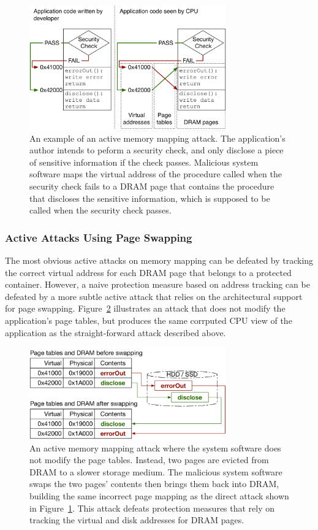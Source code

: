 \begin{figure}[hbt]
  \centering
  \includegraphics[width=85mm]{figures/active_mapping_attack.pdf}
  \caption{
    An example of an active memory mapping attack. The application's author
    intends to peform a security check, and only disclose a piece of sensitive
    information if the check passes. Malicious system software maps the virtual
    address of the procedure called when the security check fails to a DRAM
    page that contains the procedure that discloses the sensitive information,
    which is supposed to be called when the security check passes.
  }
  \label{fig:active_mapping_attack}
\end{figure}


\subsubsection{Active Attacks Using Page Swapping}
\label{sec:page_swapping_attacks}

The most obvious active attacks on memory mapping can be defeated by tracking
the correct virtual address for each DRAM page that belongs to a protected
container. However, a naive protection measure based on address tracking can be
defeated by a more subtle active attack that relies on the architectural
support for page swapping. Figure~\ref{fig:swap_mapping_attack} illustrates an
attack that does not modify the application's page tables, but produces the
same corrputed CPU view of the application as the straight-forward attack
described above.

\begin{figure}[hbt]
  \centering
  \includegraphics[width=85mm]{figures/swap_mapping_attack.pdf}
  \caption{
    An active memory mapping attack where the system software does not modify
    the page tables. Instead, two pages are evicted from DRAM to a slower
    storage medium. The malicious system software swaps the two pages' contents
    then brings them back into DRAM, building the same incorrect page mapping
    as the direct attack shown in Figure~\ref{fig:active_mapping_attack}. This
    attack defeats protection measures that rely on tracking the virtual and
    disk addresses for DRAM pages.
  }
  \label{fig:swap_mapping_attack}
\end{figure}


